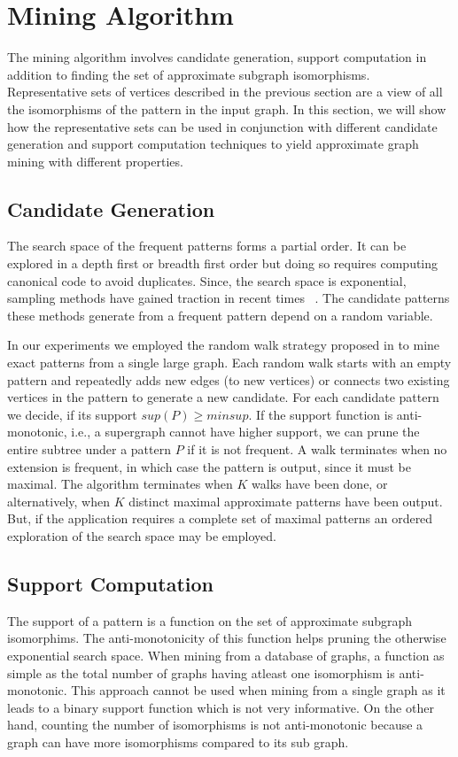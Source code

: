 \section{Mining Algorithm}
 The mining algorithm involves candidate generation, support computation
 in addition to finding the set of approximate subgraph isomorphisms.
 Representative sets of vertices described in the previous section are a view
 of all the isomorphisms of the pattern in the input graph. In this section,
 we will show how the representative sets can be used in conjunction
 with different candidate generation and support computation techniques
 to yield approximate graph mining with different properties.


\subsection{Candidate Generation} 

The search space of the frequent patterns forms a partial order. 
It can be explored in a depth first or
breadth first order but doing so requires computing canonical code to avoid
duplicates. Since, the search space is exponential, sampling methods
have gained traction in recent times~\cite{2008-origami:sadm,2009-graphsampling}
. The candidate patterns these methods
generate from a frequent pattern depend on a random variable. 


In our experiments we employed the random walk strategy proposed in
\cite{2011-icdm} to mine exact patterns from a single large graph. Each
random walk starts with an empty pattern and repeatedly adds new edges
(to new vertices) or connects two existing vertices in the pattern to
generate a new candidate.  
For each
candidate pattern we decide,  if its support $sup(P) \geq minsup$.
If the support function is anti-monotonic, i.e., a supergraph 
cannot have higher support,
we can prune the entire subtree under a pattern $P$ if it is not
frequent. A walk terminates when no extension is
frequent, in which case the pattern is output, since it must be
maximal. The algorithm terminates when $K$ walks have been done, or
alternatively, when $K$ distinct maximal approximate
patterns have been output. But, if the 
application requires a complete set of maximal patterns an ordered exploration
of the search space may be employed.

\subsection{Support Computation}
The support of a pattern is a function on the set of approximate subgraph
isomorphims. The anti-monotonicity of this function helps pruning the
otherwise exponential search space. When mining from a database
of graphs, a function as simple as the total number of graphs having
atleast one isomorphism is anti-monotonic. This approach cannot
be used when mining from a single graph as it leads to a binary support
function which is not very informative. On the other hand, counting the
number of isomorphisms is not anti-monotonic because a graph can have
more isomorphisms compared to its sub graph.

